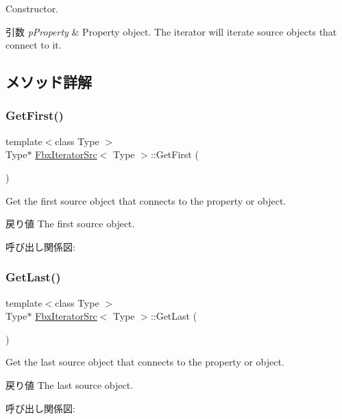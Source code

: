 Constructor. 
\begin{DoxyParams}{引数}
{\em p\+Property} & Property object. The iterator will iterate source objects that connect to it. \\
\hline
\end{DoxyParams}


\subsection{メソッド詳解}
\mbox{\label{class_fbx_iterator_src_aef5d6205bcb4f41501f5a1ec1765182c}} 
\subsubsection{\texorpdfstring{Get\+First()}{GetFirst()}}
{\footnotesize\ttfamily template$<$class Type $>$ \\
Type$\ast$ \hyperlink{class_fbx_iterator_src}{Fbx\+Iterator\+Src}$<$ Type $>$\+::Get\+First (\begin{DoxyParamCaption}{ }\end{DoxyParamCaption})}

Get the first source object that connects to the property or object. \begin{DoxyReturn}{戻り値}
The first source object. 
\end{DoxyReturn}
呼び出し関係図\+:
\mbox{\label{class_fbx_iterator_src_a44c9746ef3d04a0993781dfea8ac7142}} 
\subsubsection{\texorpdfstring{Get\+Last()}{GetLast()}}
{\footnotesize\ttfamily template$<$class Type $>$ \\
Type$\ast$ \hyperlink{class_fbx_iterator_src}{Fbx\+Iterator\+Src}$<$ Type $>$\+::Get\+Last (\begin{DoxyParamCaption}{ }\end{DoxyParamCaption})}

Get the last source object that connects to the property or object. \begin{DoxyReturn}{戻り値}
The last source object. 
\end{DoxyReturn}
呼び出し関係図\+:
\mbox{\label{class_fbx_iterator_src_a04efb028369a31d5a822c3b2a7e23b16}} 
